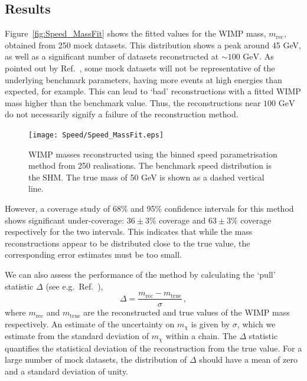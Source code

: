 \subsection{Results}
Figure~\ref{fig:Speed_MassFit} shows the fitted values for the WIMP mass, \(m_\textrm{rec}\), obtained from 250 mock datasets. This distribution shows a peak around 45 GeV, as well as a significant number of datasets reconstructed at \(\sim 100 \textrm{ GeV}\). As pointed out by Ref.\ \cite{Strege:2012}, some mock datasets will not be representative of the underlying benchmark parameters, having more events at high energies than expected, for example. This can lead to `bad' reconstructions with a fitted WIMP mass higher than the benchmark value. Thus, the reconstructions near \(100 \textrm{ GeV}\) do not necessarily signify a failure of the reconstruction method.

 \begin{figure}[t]
\centering
  \texttt{[image: Speed/Speed\_MassFit.eps]}
  \caption[Distribution of reconstructed WIMP masses using the binned speed parametrisation]{WIMP masses reconstructed using the binned speed parametrisation method from 250 realisations. The benchmark speed distribution is the SHM. The true mass of 50 GeV is shown as a dashed vertical line.} 
  \label{fig:Speed:Speed_MassFit}
\end{figure}

However, a coverage study of 68\% and 95\% confidence intervals for this method shows significant under-coverage: \(36 \pm 3 \%\) coverage and \(63 \pm 3 \%\) coverage respectively for the two intervals. This indicates that while the mass reconstructions appear to be distributed close to the true value, the corresponding error estimates must be too small. 

We can also assess the performance of the method by calculating the `pull' statistic \(\Delta\) (see e.g.\ Ref.\ \cite{Pulls}),
\begin{equation}
\Delta = \frac{m_\textrm{rec} - m_\textrm{true}}{\sigma} \,,
\end{equation}   
where \(m_\textrm{rec}\) and \(m_\textrm{true}\) are the reconstructed and true values of the WIMP mass respectively. An estimate of the uncertainty on $m_\chi$ is given by $\sigma$, which we estimate from the standard deviation of $m_\chi$ within a chain. The \(\Delta\) statistic quantifies the statistical deviation of the reconstruction from the true value. For a large number of mock datasets, the distribution of \(\Delta\) should have a mean of zero and a standard deviation of unity. 

